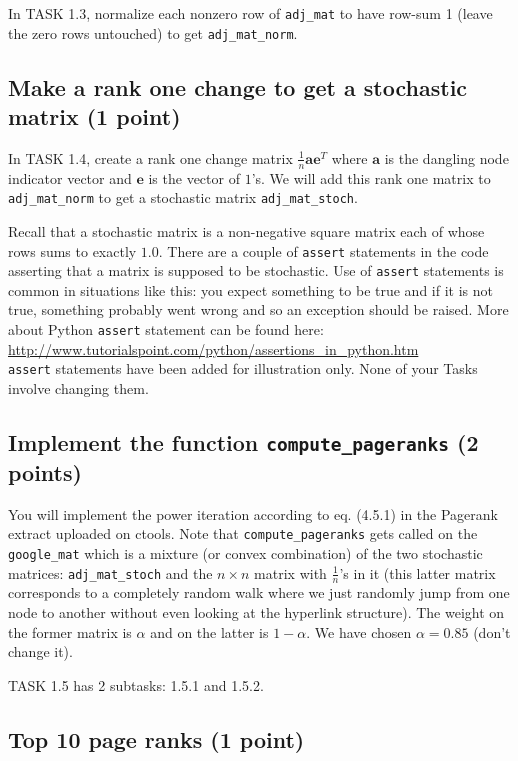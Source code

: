 \documentclass{article}
\begin{document}
In TASK 1.3, normalize each nonzero row of \verb#adj_mat# to have row-sum 1 (leave the zero rows untouched) to get \verb#adj_mat_norm#.

\subsection{Make a rank one change to get a stochastic matrix (1 point)}

In TASK 1.4, create a rank one change matrix $\frac{1}{n} \mathbf{a} \mathbf{e}^T$ where $\mathbf{a}$ is the dangling node indicator vector and $\mathbf{e}$ is the vector of $1$'s.
We will add this rank one matrix to {\tt adj\_mat\_norm} to get a stochastic matrix {\tt adj\_mat\_stoch}.

Recall that a stochastic matrix is a non-negative square matrix each of whose rows sums to exactly $1.0$. There are a couple of {\tt assert} statements in the code asserting that
a matrix is supposed to be stochastic. Use of {\tt assert} statements is common in situations like this: you expect something to be true and if it is not true, something probably went wrong
and so an exception should be raised. More about Python {\tt assert} statement can be found here:\\
\url{http://www.tutorialspoint.com/python/assertions_in_python.htm}\\
{\tt assert} statements have been added for illustration only. None of your Tasks involve changing them.

\subsection{Implement the function {\tt compute\_pageranks} (2 points)}

You will implement the power iteration according to eq. (4.5.1) in the Pagerank extract uploaded on ctools. Note that {\tt compute\_pageranks} gets called on the {\tt google\_mat}
which is a mixture (or convex combination) of the two stochastic matrices: {\tt adj\_mat\_stoch} and the $n \times n$ matrix with $\frac{1}{n}$'s in it (this latter matrix
corresponds to a completely random walk where we just randomly jump from one node to another without even looking at the hyperlink structure). The weight
on the former matrix is $\alpha$ and on the latter is $1-\alpha$. We have chosen $\alpha = 0.85$ (don't change it).

TASK 1.5 has 2 subtasks: 1.5.1 and 1.5.2.

\subsection{Top 10 page ranks (1 point)}
\end{document}
